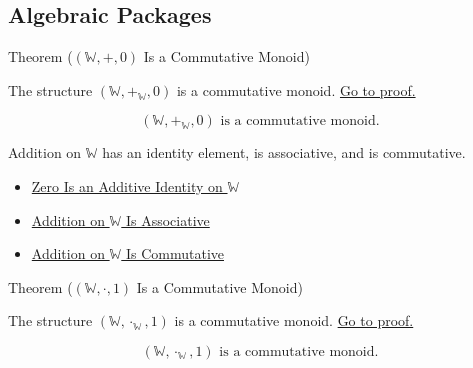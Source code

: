 \subsection*{Algebraic Packages}

\begin{theorembox}{Theorem (\texorpdfstring{$(\mathbb{W},+,0)$}{(W,+,0)} Is a Commutative Monoid)}
\begin{theorem}
\label{thm:w-additive-commutative-monoid}
The structure $(\mathbb{W},+_{\mathbb{W}},0)$ is a commutative monoid.
\hyperref[prf:w-additive-commutative-monoid]{Go to proof.}
\end{theorem}
\end{theorembox}

\begin{remark*}
\[
(\mathbb{W},+_{\mathbb{W}},0)\text{ is a commutative monoid}.
\]
\end{remark*}

\begin{remark*}[Interpretation]
Addition on $\mathbb{W}$ has an identity element, is associative, and is
commutative.
\end{remark*}

\begin{dependencies}
\begin{itemize}
  \item \hyperref[thm:zero-additive-identity-on-w]{Zero Is an Additive Identity on $\mathbb{W}$}
  \item \hyperref[thm:addition-on-w-associative]{Addition on $\mathbb{W}$ Is Associative}
  \item \hyperref[thm:addition-on-w-commutative]{Addition on $\mathbb{W}$ Is Commutative}
\end{itemize}
\end{dependencies}

\begin{theorembox}{Theorem (\texorpdfstring{$(\mathbb{W},\cdot,1)$}{(W,*,1)} Is a Commutative Monoid)}
\begin{theorem}
\label{thm:w-multiplicative-commutative-monoid}
The structure $(\mathbb{W},\cdot_{\mathbb{W}},1)$ is a commutative monoid.
\hyperref[prf:w-multiplicative-commutative-monoid]{Go to proof.}
\end{theorem}
\end{theorembox}

\begin{remark*}
\[
(\mathbb{W},\cdot_{\mathbb{W}},1)\text{ is a commutative monoid}.
\]
\end{remark*}

